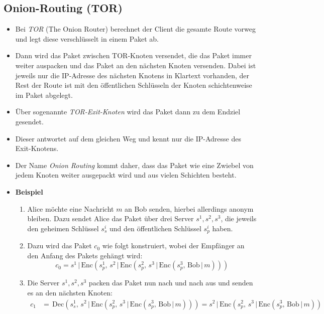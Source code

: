 \documentclass[a4paper, 11pt, accentcolor = tud3b]{tudreport}
\newcommand{\Enc}{\ensuremath{\textrm{Enc}}}
\newcommand{\Dec}{\ensuremath{\textrm{Dec}}}
\begin{document}
            \subsection{Onion-Routing (TOR)}
                \begin{itemize}
                	\item Bei \textit{TOR} (The Onion Router) berechnet der Client die gesamte Route vorweg und legt diese verschlüsselt in einem Paket ab.
                	\item Dann wird das Paket zwischen TOR-Knoten versendet, die das Paket immer weiter auspacken und das Paket an den nächsten Knoten versenden. Dabei ist jeweils nur die IP-Adresse des nächsten Knotens in Klartext vorhanden, der Rest der Route ist mit den öffentlichen Schlüsseln der Knoten schichtenweise im Paket abgelegt.
                	\item Über sogenannte \textit{TOR-Exit-Knoten} wird das Paket dann zu dem Endziel gesendet.
                	\item Dieser antwortet auf dem gleichen Weg und kennt nur die IP-Adresse des Exit-Knotens.
                	\item Der Name \textit{Onion Routing} kommt daher, dass das Paket wie eine Zwiebel von jedem Knoten weiter ausgepackt wird und aus vielen Schichten besteht.
                	\item \textbf{Beispiel}
	                	\begin{enumerate}
	                		\item Alice möchte eine Nachricht \(m\) an Bob senden, hierbei allerdings anonym bleiben. Dazu sendet Alice das Paket über drei Server \( s^1, s^2, s^3 \), die jeweils den geheimen Schlüssel \( s^i_s \) und den öffentlichen Schlüssel \( s^i_p \) haben.
	                		\item Dazu wird das Paket \( c_0 \) wie folgt konstruiert, wobei der Empfänger an den Anfang des Pakets gehängt wird:
		                		\begin{equation*}
			                		c_0 = s^1 \,\vert\, \Enc(s^1_p,\, s^2 \,\vert\, \Enc(s^2_p,\, s^3 \,\vert\, \Enc(s^3_p,\, \text{Bob} \,\vert\, m)))
		                		\end{equation*}
		                	\item Die Server \( s^1, s^2, s^3 \) packen das Paket nun nach und nach aus und senden es an den nächsten Knoten:
			                	\begin{align*}
				                	c_1 &=\, \Dec(s^1_s,\, s^2 \,\vert\, \Enc(s^2_p,\, s^3 \,\vert\, \Enc(s^3_p,\, \text{Bob} \,\vert\, m))) = s^2 \,\vert\, \Enc(s^2_p,\, s^3 \,\vert\, \Enc(s^3_p,\, \text{Bob} \,\vert\, m)) \\

\end{align*}
\end{enumerate}
\end{itemize}
\end{document}
